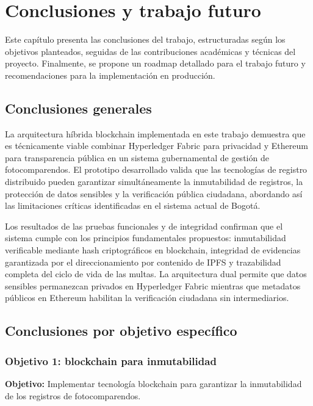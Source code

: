 \section{Conclusiones y trabajo futuro}

Este capítulo presenta las conclusiones del trabajo, estructuradas según los objetivos planteados, seguidas de las contribuciones académicas y técnicas del proyecto. Finalmente, se propone un roadmap detallado para el trabajo futuro y recomendaciones para la implementación en producción.

\subsection{Conclusiones generales}

La arquitectura híbrida blockchain implementada en este trabajo demuestra que es técnicamente viable combinar Hyperledger Fabric para privacidad y Ethereum para transparencia pública en un sistema gubernamental de gestión de fotocomparendos. El prototipo desarrollado valida que las tecnologías de registro distribuido pueden garantizar simultáneamente la inmutabilidad de registros, la protección de datos sensibles y la verificación pública ciudadana, abordando así las limitaciones críticas identificadas en el sistema actual de Bogotá.

Los resultados de las pruebas funcionales y de integridad confirman que el sistema cumple con los principios fundamentales propuestos: inmutabilidad verificable mediante hash criptográficos en blockchain, integridad de evidencias garantizada por el direccionamiento por contenido de IPFS y trazabilidad completa del ciclo de vida de las multas. La arquitectura dual permite que datos sensibles permanezcan privados en Hyperledger Fabric mientras que metadatos públicos en Ethereum habilitan la verificación ciudadana sin intermediarios.

\subsection{Conclusiones por objetivo específico}

\subsubsection{Objetivo 1: blockchain para inmutabilidad}

\textbf{Objetivo:} Implementar tecnología blockchain para garantizar la inmutabilidad de los registros de fotocomparendos.


